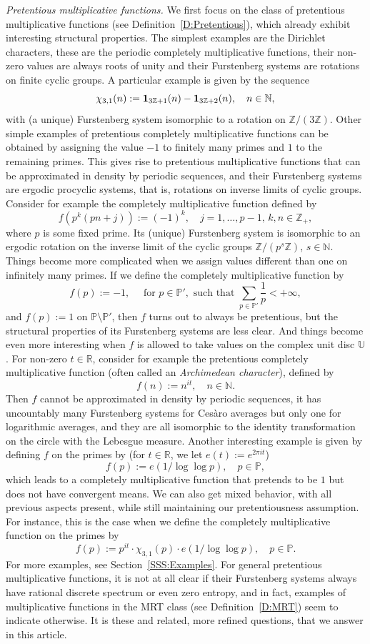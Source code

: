 \documentclass[11pt]{amsart}
\theoremstyle{definition}
\newcommand{\N}{{\mathbb N}}
\renewcommand{\P}{{\mathbb P}}
\newcommand{\R}{{\mathbb R}}
\newcommand{\Z}{{\mathbb Z}}
\newcommand{\U}{{\mathbb U}}
\begin{document}
{\em  Pretentious multiplicative functions.}
We first focus on the class of pretentious multiplicative functions (see Definition~\ref{D:Pretentious}), which already exhibit interesting structural properties.
The simplest examples  are the Dirichlet characters, these  are the periodic completely multiplicative functions, their non-zero values are always   roots of unity and  their Furstenberg systems are rotations on finite cyclic groups. A particular example is given by the sequence
$$
\chi_{3,1}(n):={\bf 1}_{3\Z+1}(n)- {\bf 1}_{3\Z+2}(n), \quad n\in\N,
$$
with (a unique) Furstenberg system isomorphic to  a rotation on  $\Z/(3\Z)$.
Other simple examples of pretentious
 completely multiplicative functions can be obtained by  assigning the value $-1$ to finitely many  primes and $1$ to the remaining primes. This gives rise to pretentious multiplicative functions that can be approximated in density by periodic sequences, and their Furstenberg systems are ergodic procyclic systems, that is, rotations on inverse limits of cyclic groups.
 Consider for example the completely multiplicative function defined by
 $$
 f(p^k(pn+j)):=(-1)^k, \quad j=1,\ldots, p-1, \, k,n\in \Z_+,
 $$
 where $p$ is some fixed prime.
Its  (unique) Furstenberg system is  isomorphic to an ergodic  rotation on the inverse limit of the cyclic groups $\Z/(p^s\Z)$, $s\in\N$.
 Things become more complicated when we assign values different than one on infinitely many primes.  If  we define the completely multiplicative function by
 $$
 f(p):=-1,\quad \text{ for } p\in \P',\text{ such that } \sum_{p\in \P'}\frac{1}{p}<+\infty,
 $$
and   $f(p):=1$ on $\P\setminus \P'$, then $f$  turns out to   always be pretentious, but the structural properties of  its Furstenberg systems   are less clear.
And things become even more interesting when $f$ is allowed to take values on the complex unit disc $\U$. For non-zero $t\in \R$, consider for example the pretentious completely multiplicative function (often called an {\em Archimedean character}),  defined by
  $$
  f(n):=n^{it},
  \quad n\in \N.
 $$
Then $f$ cannot be approximated in density by periodic sequences, it has uncountably many Furstenberg systems for Ces\`aro averages but only one for logarithmic averages, and they are all isomorphic to the identity transformation  on the circle with the Lebesgue measure.
Another interesting example is given by defining $f$ on the primes by (for $t\in \R$, we let $e(t):=e^{2\pi i t}$)
$$
f(p):=e(1/\log\log{p}), \quad p\in \P,
$$
which leads to a completely multiplicative function that pretends to be $1$ but does not have convergent means.
We can also  get mixed behavior, with all  previous aspects present, while still maintaining our pretentiousness assumption.
For instance, this is the case when we define the completely multiplicative function on the primes by
$$
f(p):=p^{it} \cdot \chi_{3,1}(p)\cdot e(1/ \log\log{p}), \quad p\in \P.
$$
For more examples, see Section~\ref{SSS:Examples}.
For general pretentious multiplicative functions,  it is not at all clear if their Furstenberg systems  always have rational discrete spectrum or even zero entropy, and in fact, examples of multiplicative functions in the MRT class (see Definition~\ref{D:MRT})  seem to indicate otherwise. It is these and related, more refined questions, that we  answer in this article.
\end{document}
